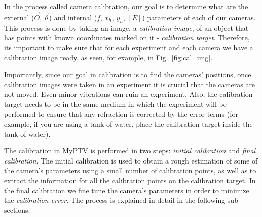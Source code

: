 \documentclass[10pt,a4paper]{article}
\begin{document}
In the process called camera calibration, our goal is to determine what are the external ($\vec{O}$, $\vec{\theta}$) and internal ($f$, $x_h,\,y_h$, $[E]$) parameters of each of our cameras. This process is done by taking an image, a \textit{calibration image}, of an object that has points with known coordinates marked on it - \textit{calibration target}. Therefore, its important to make sure that for each experiment and each camera we have a calibration image ready, as seen, for example, in Fig.~\ref{fig:cal_img}.


Importantly, since our goal in calibration is to find the cameras' positions, once calibration images were taken in an experiment it is crucial that the cameras are not moved. Even minor vibrations can ruin an experiment. Also, the calibration target needs to be in the same medium in which the experiment will be performed to ensure that any refraction is corrected by the error terms (for example, if you are using a tank of water, place the calibration target inside the tank of water). 


The calibration in MyPTV is performed in two steps: \textit{initial calibration} and \textit{final calibration}. The initial calibration is used to obtain a rough estimation of some of the camera's parameters using a small number of calibration points, as well as to extract the information for all the calibration points on the calibration target. In the final calibration we fine tune the camera's parameters in order to minimize the \textit{calibration error}. The process is explained in detail in the following sub sections. 


%
%
\end{document}

